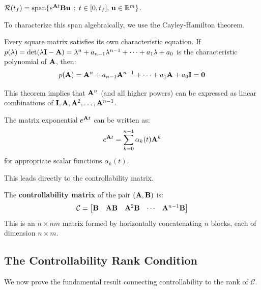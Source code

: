 \begin{lemma}
\label{lemma:reachable_span}
$\mathcal{R}(t_f) = \text{span}\{e^{\mathbf{A} t}\mathbf{B}\mathbf{u} \,:\, t \in [0,t_f],\, \mathbf{u} \in \mathbb{R}^m\}$.
\end{lemma}

To characterize this span algebraically, we use the Cayley-Hamilton theorem.

\begin{theorem}
Every square matrix satisfies its own characteristic equation. If $p(\lambda) = \det(\lambda\mathbf{I} - \mathbf{A}) = \lambda^n + a_{n-1}\lambda^{n-1} + \cdots + a_1\lambda + a_0$ is the characteristic polynomial of $\mathbf{A}$, then:
\begin{equation}
p(\mathbf{A}) = \mathbf{A}^n + a_{n-1}\mathbf{A}^{n-1} + \cdots + a_1\mathbf{A} + a_0\mathbf{I} = \mathbf{0}
\end{equation}
\end{theorem}

This theorem implies that $\mathbf{A}^n$ (and all higher powers) can be expressed as linear combinations of $\mathbf{I}, \mathbf{A}, \mathbf{A}^2, \ldots, \mathbf{A}^{n-1}$.

\begin{corollary}
The matrix exponential $e^{\mathbf{A} t}$ can be written as:
\begin{equation}
e^{\mathbf{A} t} = \sum_{k=0}^{n-1} \alpha_k(t)\mathbf{A}^k
\end{equation}
for appropriate scalar functions $\alpha_k(t)$.
\end{corollary}

This leads directly to the controllability matrix.

\begin{definition}
\label{def:controllability_matrix}
The \textbf{controllability matrix} of the pair $(\mathbf{A}, \mathbf{B})$ is:
\begin{equation}
\mathcal{C} = \begin{bmatrix} \mathbf{B} & \mathbf{A}\mathbf{B} & \mathbf{A}^2\mathbf{B} & \cdots & \mathbf{A}^{n-1}\mathbf{B} \end{bmatrix}
\label{eq:controllability_matrix}
\end{equation}
This is an $n \times nm$ matrix formed by horizontally concatenating $n$ blocks, each of dimension $n \times m$.
\end{definition}

\subsection{The Controllability Rank Condition}

We now prove the fundamental result connecting controllability to the rank of $\mathcal{C}$.

